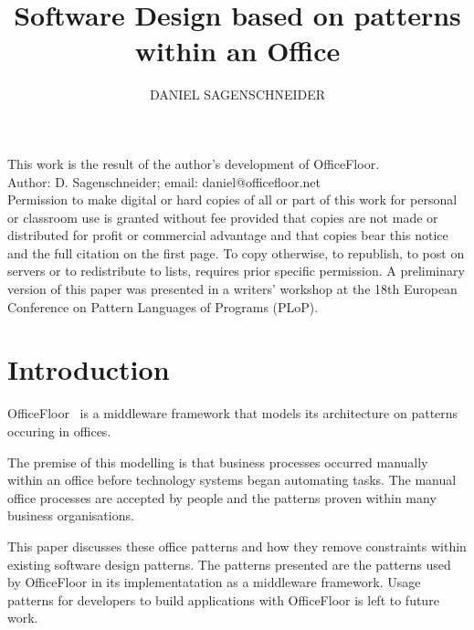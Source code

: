 \documentclass[prodmode]{style/acmlarge}
\title{Software Design based on patterns within an Office}
\author{DANIEL SAGENSCHNEIDER \affil{OfficeFloor, daniel@officefloor.net}}
\begin{document}
\graphicspath{{./pdf/}}

\lstset{language=Java}

\captionsetup[lstlisting]{font=footnotesize}


\begin{bottomstuff}
This work is the result of the author's development of OfficeFloor.\\
Author: D. Sagenschneider; email: daniel@officefloor.net\\

Permission to make digital or hard copies of all or part of this work for
personal or classroom use is granted without fee provided that copies are not
made or distributed for profit or commercial advantage and that copies bear this
notice and the full citation on the first page. To copy otherwise, to republish,
to post on servers or to redistribute to lists, requires prior specific
permission. A preliminary version of this paper was presented in a writers'
workshop at the 18th European Conference on Pattern Languages of Programs
(PLoP).
\end{bottomstuff}

\maketitle



\section{Introduction}

OfficeFloor~\cite{officefloor} is a middleware framework that models its
architecture on patterns occuring in offices.

The premise of this modelling is that business processes occurred manually
within an office before technology systems began automating tasks.  The manual
office processes are accepted by people and the patterns proven within many
business organisations.

This paper discusses these office patterns and how they remove constraints
within existing software design patterns.  The patterns presented are the
patterns used by OfficeFloor in its implementatation as a middleware framework.
Usage patterns for developers to build applications with OfficeFloor is left to
future work.
\end{document}
